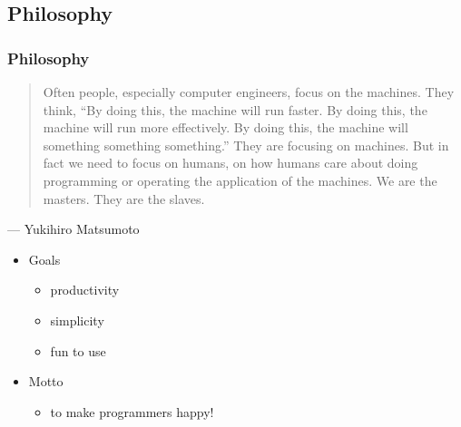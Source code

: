 \subsection{Philosophy}
\begin{frame}\frametitle{Philosophy}


\begin{quote}
Often people, especially computer engineers, focus on the machines. They think, ``By doing this, the machine will run faster. By doing this, the machine will run more effectively. By doing this, the machine will something something something.'' They are focusing on machines. But in fact we need to focus on humans, on how humans care about doing programming or operating the application of the machines. We are the masters. They are the slaves.
\end{quote}\par\raggedleft--- \textup{Yukihiro Matsumoto}   \pause

\begin{itemize}

\item Goals 
\begin{itemize}
\item productivity
\item simplicity
\item fun to use
\end{itemize}

\pause

\item Motto
\begin{itemize}
\item to make programmers happy!
\end{itemize}

\end{itemize} 

\end{frame}




